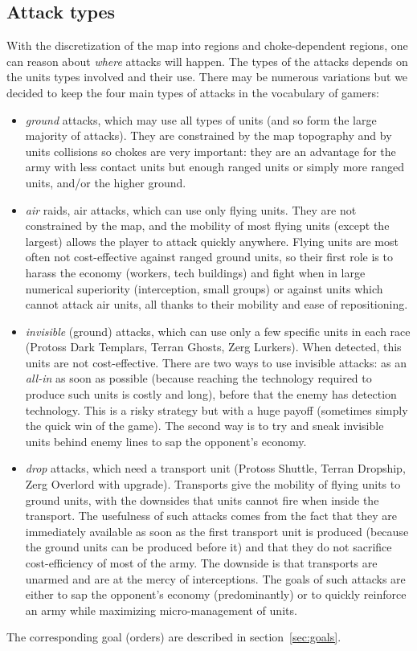 \subsection{Attack types}
\label{sec:attacktypes}
With the discretization of the map into regions and choke-dependent regions, one can reason about \textit{where} attacks will happen. The types of the attacks depends on the units types involved and their use. There may be numerous variations but we decided to keep the four main types of attacks in the vocabulary of gamers:
\begin{itemize}
    \item \textit{ground} attacks, which may use all types of units (and so form the large majority of attacks). They are constrained by the map topography and by units collisions so chokes are very important: they are an advantage for the army with less contact units but enough ranged units or simply more ranged units, and/or the higher ground. 
    \item \textit{air} raids, air attacks, which can use only flying units. They are not constrained by the map, and the mobility of most flying units (except the largest) allows the player to attack quickly anywhere. Flying units are most often not cost-effective against ranged ground units, so their first role is to harass the economy (workers, tech buildings) and fight when in large numerical superiority (interception, small groups) or against units which cannot attack air units, all thanks to their mobility and ease of repositioning.
    \item \textit{invisible} (ground) attacks, which can use only a few specific units in each race (Protoss Dark Templars, Terran Ghosts, Zerg Lurkers). When detected, this units are not cost-effective. There are two ways to use invisible attacks: as an \textit{all-in} as soon as possible (because reaching the technology required to produce such units is costly and long), before that the enemy has detection technology. This is a risky strategy but with a huge payoff (sometimes simply the quick win of the game). The second way is to try and sneak invisible units behind enemy lines to sap the opponent's economy.
    \item \textit{drop} attacks, which need a transport unit (Protoss Shuttle, Terran Dropship, Zerg Overlord with upgrade). Transports give the mobility of flying units to ground units, with the downsides that units cannot fire when inside the transport. The usefulness of such attacks comes from the fact that they are immediately available as soon as the first transport unit is produced (because the ground units can be produced before it) and that they do not sacrifice cost-efficiency of most of the army. The downside is that transports are unarmed and are at the mercy of interceptions. The goals of such attacks are either to sap the opponent's economy (predominantly) or to quickly reinforce an army while maximizing micro-management of units.
\end{itemize}
The corresponding goal (orders) are described in section~\ref{sec:goals}.


